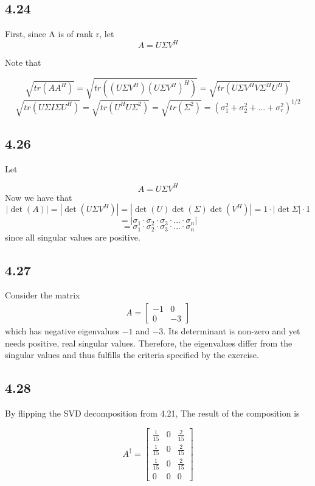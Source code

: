 \documentclass[letterpaper,12pt]{article}
\theoremstyle{definition}
\begin{document}
\subsection*{4.24}

First, since A is of rank r, let 
\[A = U\Sigma V^H \]

Note that

\[\sqrt{tr(AA^H)}=\sqrt{tr((U\Sigma V^H)(U\Sigma V^H)^H)}=\sqrt{tr(U\Sigma V^HV\Sigma^H U^H)}\]
\[\sqrt{tr(U\Sigma I\Sigma U^H)}=\sqrt{tr(U^H U\Sigma^2)}=\sqrt{tr(\Sigma^2)}=(\sigma_{1}^2+\sigma_{2}^2+...+\sigma _{r}^2)^{1/2}\]

\subsection*{4.26}

Let

\[A=U\Sigma V^H\]
Now we have that
\[|\det (A)|= |\det (U\Sigma V^H)|=|\det (U) \det (\Sigma) \det (V^H)|=1\cdot |\det \Sigma |\cdot 1\]
\[= |\sigma_1 \cdot \sigma_2 \cdot \sigma_3 \cdot ...\cdot \sigma _n|\]
\[= \sigma_1 \cdot \sigma_2 \cdot \sigma_3 \cdot ...\cdot \sigma _n\]
since all singular values are positive.



\subsection*{4.27}
Consider the matrix
\begin{align*}
    A = \begin{bmatrix}
    -1 & 0\\
    0 & -3
    \end{bmatrix}
\end{align*}
which has negative eigenvalues $-1$ and $-3$. Its determinant is non-zero and yet needs positive, real singular values. Therefore, the eigenvalues differ from the singular values and thus fulfills the criteria specified by the exercise.

\subsection*{4.28}

By flipping the SVD decomposition from 4.21, The result of the composition is 

\[A^{\dag}=\begin{bmatrix}
\frac{1}{15}&0&\frac{2}{15} \\
\frac{1}{15}&0&\frac{2}{15} \\
\frac{1}{15}&0&\frac{2}{15}\\
0&0&0
\end{bmatrix}\]
\end{document}
